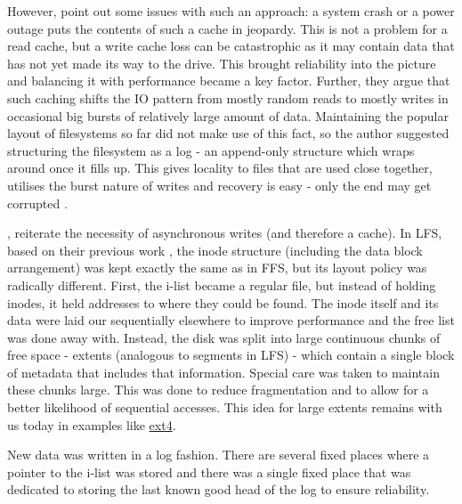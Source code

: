             However,  point out some issues with
            such an approach: a system crash or a power outage puts the
            contents of such a cache in jeopardy. This is not a problem for a
            read cache, but a write cache loss can be catastrophic as it may contain
            data that has not yet made its way to the drive. This brought
            reliability into the picture and balancing it with performance
            became a key factor. Further, they argue that such caching shifts
            the IO pattern from mostly random reads to mostly writes in
            occasional big bursts of relatively large amount of data.
            Maintaining the popular layout of filesystems so far did not make
            use of this fact, so the author suggested structuring the filesystem
            as a log - an append-only structure which wraps around once it
            fills up. This gives locality to files that are used close
            together, utilises the burst nature of writes and recovery is easy
            - only the end may get corrupted \cite{IO_bottleneck}.

            , reiterate the necessity of asynchronous writes
            (and therefore a cache). In LFS, based on their previous work \cite{IO_bottleneck},
            the inode structure (including the data block arrangement) was kept
            exactly the same as in FFS, but its layout policy was radically
            different. First, the i-list became a regular file, but instead of
            holding inodes, it held addresses to where they could be found. The
            inode itself and its data were laid our sequentially elsewhere to
            improve performance and the free list was done away with. Instead,
            the disk was split into large continuous chunks of free space -
            extents (analogous to segments in LFS) - which contain a
            single block of metadata that includes that information.  Special
            care was taken to maintain these chunks large. This was done to
            reduce fragmentation and to allow for a better likelihood of
            sequential accesses. This idea for large extents remains with us
            today in examples like \hyperref[sec:ext4]{ext4}.

            New data was written in a log fashion. There are several fixed
            places where a pointer to the i-list was stored and there was a
            single fixed place that was dedicated to storing the last known good
            head of the log to ensure reliability.

